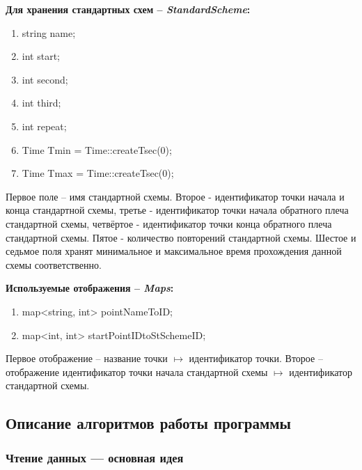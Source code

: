 \documentclass[12pt, a4 paper]{article}
\theoremstyle{plain}
\begin{document}

\textbf{Для хранения стандартных схем – \textit{StandardScheme}:}

\begin{enumerate}
	\item string name;
	\item int start;
	\item int second; 
	\item int third; 
	\item int repeat;
	\item Time Tmin = Time::createTsec(0);
	\item Time Tmax = Time::createTsec(0);
\end{enumerate}

Первое поле – имя стандартной схемы. Второе - идентификатор точки начала и конца стандартной схемы, третье - идентификатор точки начала обратного плеча стандартной схемы, четвёртое - идентификатор точки конца обратного плеча стандартной схемы. Пятое - количество повторений стандартной схемы. Шестое и седьмое поля хранят минимальное и максимальное время прохождения данной схемы соответственно.


\textbf{Используемые отображения – \textit{Maps}:}
\begin{enumerate}
	\item map<string, int> pointNameToID;
	\item map<int, int> startPointIDtoStSchemeID;
\end{enumerate}

Первое отображение – название точки $\mapsto$ идентификатор точки. Второе – отображение идентификатор точки начала стандартной схемы $\mapsto$ идентификатор стандартной схемы.

\newpage


\subsection*{Описание алгоритмов работы программы}

\subsubsection*{Чтение данных --- основная идея}
\end{document}

